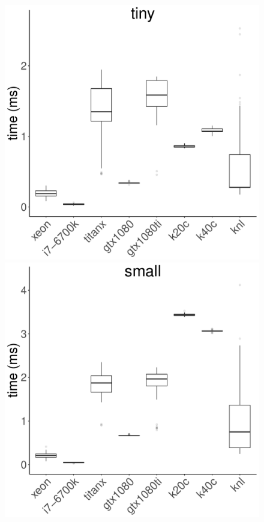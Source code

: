\documentclass[../document.tex]{subfiles}
\begin{document}
\begin{figure}[t]
	\centering
	\includegraphics[width=\plotwidth]{figures/time-results/generate_crc_tiny_boxplot_knl-1}
	\includegraphics[width=\plotwidth]{figures/time-results/generate_crc_small_boxplot_knl-1}

\end{figure}
\end{document}
